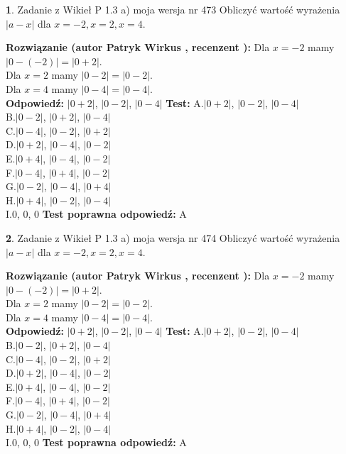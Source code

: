 \documentclass[12pt, a4paper]{article}
\theoremstyle{definition} %
\newtheorem{zad}{}
\newcommand{\zadStart}[1]{\begin{zad}#1\newline}
\newcommand{\zadStop}{\end{zad}}
\newcommand{\rozwStart}[2]{\noindent \textbf{Rozwiązanie (autor #1 , recenzent #2): }\newline}
\newcommand{\rozwStop}{\newline}
\newcommand{\odpStart}{\noindent \textbf{Odpowiedź:}\newline}
\newcommand{\odpStop}{\newline}
\newcommand{\testStart}{\noindent \textbf{Test:}\newline}
\newcommand{\testStop}{\newline}
\newcommand{\kluczStart}{\noindent \textbf{Test poprawna odpowiedź:}\newline}
\newcommand{\kluczStop}{\newline}
\begin{document}
\zadStart{Zadanie z Wikieł P 1.3 a) moja wersja nr 473}
Obliczyć wartość wyrażenia $|a - x|$ dla $x=-2,x=2,x=4$.
\zadStop
\rozwStart{Patryk Wirkus}{}
Dla $x = -2$ mamy $|0 - (-2)| = |0 + 2|$.\\
Dla $x = 2$ mamy $|0 - 2| = |0 - 2|$.\\
Dla $x = 4$ mamy $|0 - 4| = |0 - 4|$.\\
\rozwStop
\odpStart
$|0 + 2|$, $|0 - 2|$, $|0 - 4|$
\odpStop
\testStart
A.$|0 + 2|$, $|0 - 2|$, $|0 - 4|$\\
B.$|0 - 2|$, $|0 + 2|$, $|0 - 4|$\\
C.$|0 - 4|$, $|0 - 2|$, $|0 + 2|$\\
D.$|0 + 2|$, $|0 - 4|$, $|0 - 2|$\\
E.$|0 + 4|$, $|0 - 4|$, $|0 - 2|$\\
F.$|0 - 4|$, $|0 + 4|$, $|0 - 2|$\\
G.$|0 - 2|$, $|0 - 4|$, $|0 + 4|$\\
H.$|0 + 4|$, $|0 - 2|$, $|0 - 4|$\\
I.$0$, $0$, $0$
\testStop
\kluczStart
A
\kluczStop



\zadStart{Zadanie z Wikieł P 1.3 a) moja wersja nr 474}
Obliczyć wartość wyrażenia $|a - x|$ dla $x=-2,x=2,x=4$.
\zadStop
\rozwStart{Patryk Wirkus}{}
Dla $x = -2$ mamy $|0 - (-2)| = |0 + 2|$.\\
Dla $x = 2$ mamy $|0 - 2| = |0 - 2|$.\\
Dla $x = 4$ mamy $|0 - 4| = |0 - 4|$.\\
\rozwStop
\odpStart
$|0 + 2|$, $|0 - 2|$, $|0 - 4|$
\odpStop
\testStart
A.$|0 + 2|$, $|0 - 2|$, $|0 - 4|$\\
B.$|0 - 2|$, $|0 + 2|$, $|0 - 4|$\\
C.$|0 - 4|$, $|0 - 2|$, $|0 + 2|$\\
D.$|0 + 2|$, $|0 - 4|$, $|0 - 2|$\\
E.$|0 + 4|$, $|0 - 4|$, $|0 - 2|$\\
F.$|0 - 4|$, $|0 + 4|$, $|0 - 2|$\\
G.$|0 - 2|$, $|0 - 4|$, $|0 + 4|$\\
H.$|0 + 4|$, $|0 - 2|$, $|0 - 4|$\\
I.$0$, $0$, $0$
\testStop
\kluczStart
A
\kluczStop
\end{document}
